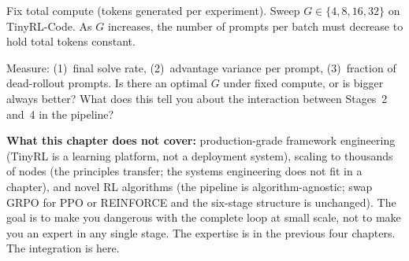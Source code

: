 \begin{exercise}
Fix total compute (tokens generated per experiment). Sweep $G \in \{4, 8, 16, 32\}$ on TinyRL-Code. As $G$ increases, the number of prompts per batch must decrease to hold total tokens constant.

Measure: (1)~final solve rate, (2)~advantage variance per prompt, (3)~fraction of dead-rollout prompts. Is there an optimal $G$ under fixed compute, or is bigger always better? What does this tell you about the interaction between Stages~2 and~4 in the pipeline?
\end{exercise}


\bigskip

\textbf{What this chapter does not cover:} production-grade framework engineering (TinyRL is a learning platform, not a deployment system), scaling to thousands of nodes (the principles transfer; the systems engineering does not fit in a chapter), and novel RL algorithms (the pipeline is algorithm-agnostic; swap GRPO for PPO or REINFORCE and the six-stage structure is unchanged). The goal is to make you dangerous with the complete loop at small scale, not to make you an expert in any single stage. The expertise is in the previous four chapters. The integration is here.

\newpage
